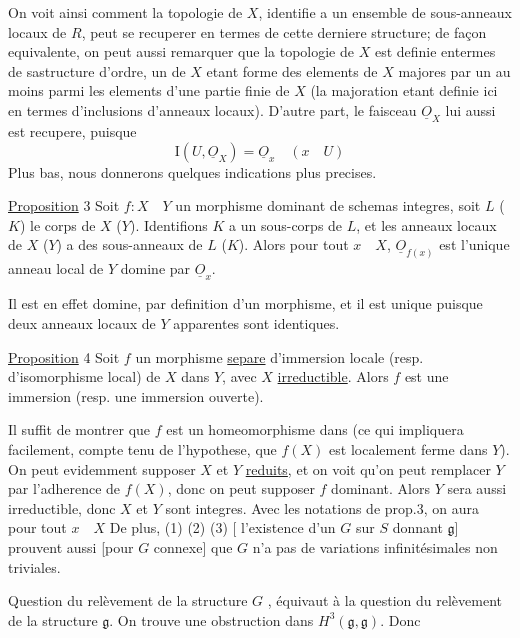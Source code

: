 On voit ainsi comment la topologie de $X$, identifie a un ensemble de sous-anneaux locaux de $R$, peut se recuperer en termes de cette derniere structure; de façon equivalente, on peut aussi remarquer que la topologie de $X$ est definie entermes de sastructure d'ordre, un  de $X$ etant forme des elements de $X$ majores par un au moins parmi les elements d'une partie finie de $X$ (la majoration etant definie  ici en termes d'inclusions  d'anneaux locaux). D'autre part, le faisceau $\underline O_X$ lui aussi est recupere, puisque
\[
\mathrm I(U,\underline O_X)=\underline O_x\quad(x\quad U)
\]
Plus bas, nous donnerons quelques indications plus precises.

\uline{Proposition} 3 Soit $f:X\quad Y$ un morphisme dominant de schemas integres,  soit $L$ ($K$) le corps de $X$ ($Y$). Identifions $K$ a un sous-corps de $L$, et les anneaux locaux de $X$ ($Y$) a des sous-anneaux de $L$ ($K$). Alors pour tout $x\quad X$, $\underline O_{f(x)}$ est l'unique anneau local de $Y$ domine par $\underline O_x$.

Il est en effet domine, par definition d'un morphisme, et il est unique puisque deux anneaux locaux de $Y$ apparentes sont identiques.

\uline{Proposition} 4 Soit $f$ un morphisme \uline{separe} d'immersion locale (resp. d'isomorphisme local) de $X$ dans $Y$, avec  $X$ \uline{irreductible}. Alors $f$ est une immersion (resp. une immersion ouverte).

Il suffit de montrer que $f$ est un homeomorphisme dans (ce qui impliquera facilement, compte tenu de l'hypothese, que $f(X)$ est localement ferme dans $Y$). On peut evidemment supposer $X$ et $Y$ \uline{reduits}, et on voit qu'on peut remplacer $Y$ par l'adherence de $f(X)$, donc on peut supposer $f$ dominant. Alors  $Y$ sera aussi irreductible, donc $X$ et $Y$ sont integres. Avec les notations de prop.3, on aura pour tout $x\quad X$
De plus, (1) (2) (3) [ l'existence d'un $G$  sur $S$ donnant $\mathfrak g$] prouvent aussi [pour $G$ connexe] que $G$ n'a pas de variations infinitésimales non triviales.

Question du relèvement de la structure $G$ , équivaut à la question du relèvement de la structure $\mathfrak g$. On trouve une obstruction dans $H^3(\mathfrak g,\mathfrak g)$. Donc

